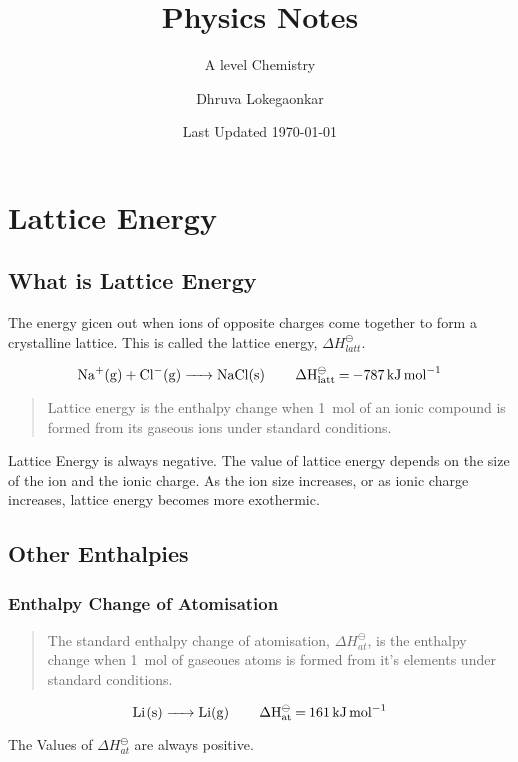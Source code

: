 \documentclass{scrbook}
\title{Physics Notes}
\subtitle{A level Chemistry}
\date{Last Updated \today{}}
\author{Dhruva Lokegaonkar}
\begin{document}
\maketitle
\tableofcontents

\chapter{Lattice Energy}

\section{What is Lattice Energy}

	The energy gicen out when ions of opposite charges come together to form a crystalline lattice. This is called the lattice energy, $\Delta H_{latt}^\ominus$.

	\[ \ce{Na+(g) + Cl-(g) ->  NaCl(s) \qquad \Delta H^\ominus_{latt} = \SI{-787}{ \kilo\joule\per\mole } }\]

	\begin{quote}
		Lattice energy is the enthalpy change when \SI{1}{\mole} of an ionic compound is formed from its gaseous ions under standard conditions.
	\end{quote}

	Lattice Energy is always negative. The value of lattice energy depends on the size of the ion and the ionic charge. As the ion size increases, or as ionic charge increases, lattice energy becomes more exothermic.

\section{Other Enthalpies}

\subsection{Enthalpy Change of Atomisation}

	\begin{quote}
		The standard enthalpy change of atomisation, $\Delta H_{at}^\ominus$, is the enthalpy change when \SI{1}{\mole} of gaseoues atoms is formed from it's elements under standard conditions.
	\end{quote}

	\[ \ce{ Li(s) -> Li(g) \qquad \Delta H^\ominus_{at} = \SI{161}{\kilo\joule\per\mole} } \]

	The Values of $\Delta H^\ominus_{at}$ are always positive.
\end{document}

